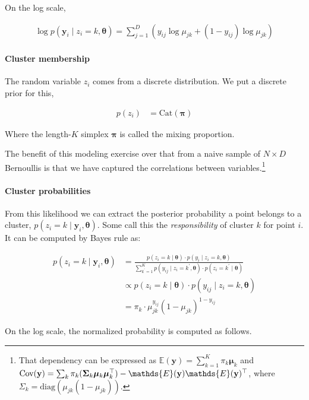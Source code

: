 \documentclass[12pt,letterpaper]{article}
\newcommand{\cov}{\textnormal{Cov}}
\newcommand{\bth}{\bm{\theta}}
\newcommand{\bmu}{\bm{\mu}}
\newcommand{\bpi}{\bm{\pi}}
\newcommand{\by}{\mathbf{y}}
\begin{document}
On the log scale,

\begin{align}
\log p(\by_{i} \mid z_{i} = k, \bth) = \sum_{j=1}^{D}(y_{ij}\log\mu_{jk} + (1 - y_{ij})\log\mu_{jk})
\end{align}

\paragraph{Cluster membership}

The random variable \(z_i\) comes from a discrete distribution. We put a
discrete prior for this,

\begin{align}
p(z_i) &= \text{Cat}(\bpi)
\end{align}

Where the length-\(K\) simplex \(\bpi\) is called the mixing proportion.

The benefit of this modeling exercise over that from a naive sample of
\(N \times D\) Bernoullis is that we have captured the correlations
between
variables.\footnote{That dependency can be expressed as \(\mathds{E}(\by) = \sum_{k = 1}^{K} \pi_{k} \bmu_{k}\) and 
\(\cov({\by}) = \sum_{k} \pi_{k} (\mathbf{\Sigma}_k \bmu_k\bmu_{k}^{\top}) - \mathds{E}(\by)\mathds{E}(\by)^\top\), where \(\Sigma_k = \text{diag}(\mu_{jk}(1 - \mu_{jk}))\).}

\paragraph{Cluster probabilities}

From this likelihood we can extract the posterior probability a point
belongs to a cluster, \(p(z_i = k \mid \by_i, \bth)\). Some call this
the \emph{responsibility} of cluster \(k\) for point \(i\). It can be
computed by Bayes rule as:

\begin{align}
p(z_i = k \mid \by_{i}, \bth) &=  \frac{p(z_i = k \mid \bth)\cdot p(y_i \mid z_i = k, \bth)}{\sum^{K}_{k^\prime = 1} p(y_{ij} \mid z_i = k^\prime, \bth) \cdot p(z_i = k^\prime \mid \bth)}\\
&\propto p(z_i = k \mid \bth)\cdot p(y_{ij} \mid z_i = k, \bth)\\
&=  \pi_k\cdot\mu_{jk}^{y_{ij}}(1 - \mu_{jk})^{1 - y_{ij}}
\end{align}

On the log scale, the normalized probability is computed as follows.
\end{document}
